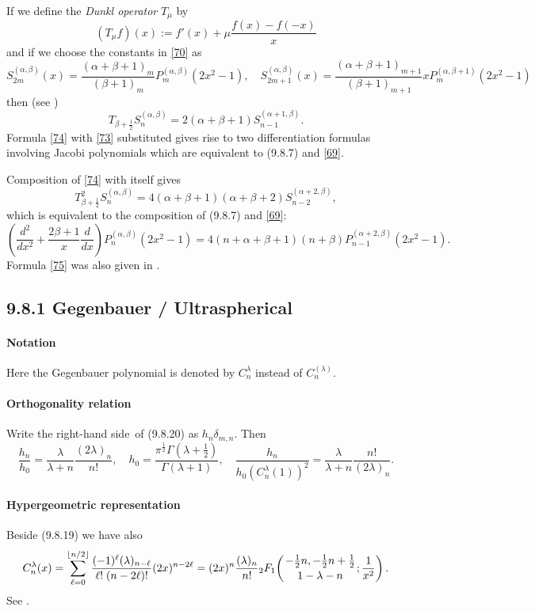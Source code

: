 \documentclass[twoside,11pt]{article}
\newcommand\al\alpha
\newcommand\be\beta
\newcommand\de\delta
\newcommand\la\lambda
\newcommand\Ga{\Gamma}
\newcommand\half{\frac12}
\newcommand\thalf{\tfrac12}
\newcommand{\hyp}[5]{ \mbox{}_{#1}F_{#2}\!\left(
  \genfrac{}{}{0pt}{}{#3}{#4};#5\right)}
\newcommand\RHS{right-hand side}
\begin{document}
If we define the {\em Dunkl operator} $T_\mu$ by
\begin{equation}
(T_\mu f)(x):=f'(x)+\mu \frac{f(x)-f(-x)}x
\label{72}
\end{equation}
and if we choose the constants in \eqref{70} as
\begin{equation}
S_{2m}^{(\al,\be)}(x)=\frac{(\al+\be+1)_m}{(\be+1)_m}  P_m^{(\al,\be)}(2x^2-1),\quad
S_{2m+1}^{(\al,\be)}(x)=\frac{(\al+\be+1)_{m+1}}{(\be+1)_{m+1}} 
x P_m^{(\al,\be+1)}(2x^2-1)
\label{73}
\end{equation}
then (see \cite[(1.6)]{K5})
\begin{equation}
T_{\be+\half}S_n^{(\al,\be)}=2(\al+\be+1) S_{n-1}^{(\al+1,\be)}.
\label{74}
\end{equation}
Formula \eqref{74} with \eqref{73} substituted gives rise to two
differentiation formulas involving Jacobi polynomials which are equivalent to
(9.8.7) and \eqref{69}.

Composition of \eqref{74} with itself gives
\[
T_{\be+\half}^2S_n^{(\al,\be)}=4(\al+\be+1)(\al+\be+2) S_{n-2}^{(\al+2,\be)},
\]
which is equivalent to the composition of (9.8.7) and \eqref{69}:
\begin{equation}
\left(\frac{d^2}{dx^2}+\frac{2\be+1}x \frac d{dx}\right)P_n^{(\al,\be)}(2x^2-1)
=4(n+\al+\be+1)(n+\be) P_{n-1}^{(\al+2,\be)}(2x^2-1).
\label{75}
\end{equation}
Formula \eqref{75} was also given in .
%
\subsection*{9.8.1 Gegenbauer / Ultraspherical}
\label{sec9.8.1}
%
\paragraph{Notation}
Here the Gegenbauer polynomial is denoted by $C_n^\la$ instead of $C_n^{(\la)}$.
%
\paragraph{Orthogonality relation}
Write the \RHS\ of (9.8.20) as $h_n \de_{m,n}$. Then
\begin{equation}
\frac{h_n}{h_0}=
\frac\la{\la+n} \frac{(2\la)_n}{n!} ,\quad
h_0=\frac{\pi^\half \Ga(\la+\thalf)}{\Ga(\la+1)},\quad
\frac{h_n}{h_0 (C_n^\la(1))^2}=
\frac\la{\la+n} \frac{n!}{(2\la)_n} .
\label{61}
\end{equation}
%
\paragraph{Hypergeometric representation}
Beside (9.8.19) we have also
\begin{equation}
C_n^\lambda(x)=\sum_{\ell=0}^{\lfloor n/2\rfloor}\frac{(-1)^{\ell}(\lambda)_{n-\ell}}
{\ell!\;(n-2\ell)!} (2x)^{n-2\ell}
=(2x)^{n} \frac{(\lambda)_{n}}{n!} 
\hyp21{-\thalf n,-\thalf n+\thalf}{1-\la-n}{\frac1{x^2}}.
\label{57}
\end{equation}
See .
%
\end{document}
